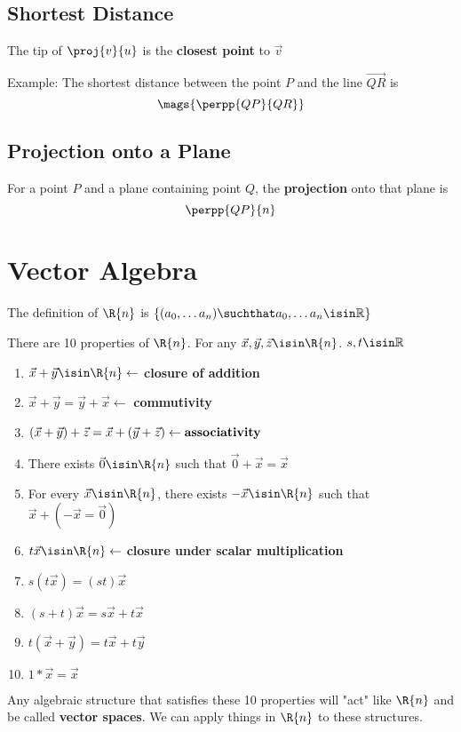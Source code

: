 \documentclass[12pt]{article}
\begin{document}
\subsection*{Shortest Distance}
The tip of $\proj{v}{u}$ is the {\bf closest point} to $\vec{v}$

Example: The shortest distance between the point $P$ and the line $\vec{QR}$ is \[ \mags{\perpp{QP}{QR}} \]

\subsection*{Projection onto a Plane}
For a point $P$ and a plane containing point $Q$, the {\bf projection} onto that plane is \[ \perpp{QP}{n} \]

\section*{Vector Algebra}
The definition of $\R{n}$ is $\{(a_0,\dots a_n)\suchthat a_0,\dots a_n\isin\mathbb{R}\}$

There are 10 properties of $\R{n}$. For any $\vec{x}, \vec{y}, \vec{z}\isin\R{n}$. $s,t\isin\mathbb{R}$
\begin{enumerate}
\item $\vec{x} + \vec{y}\isin\R{n} \leftarrow$ {\bf closure of addition}
\item $\vec{x} + \vec{y} = \vec{y} + \vec{x} \leftarrow$ {\bf commutivity}
\item $(\vec{x} + \vec{y}) + \vec{z} = \vec{x} + (\vec{y} + \vec{z}) \leftarrow {\bf associativity}$
\item There exists $\vec{0}\isin\R{n}$ such that $\vec{0} + \vec{x} = \vec{x}$
\item For every $\vec{x}\isin\R{n}$, there exists $-\vec{x}\isin\R{n}$ such that $\vec{x} + (-\vec{x} = \vec{0})$
\item $t\vec{x}\isin\R{n} \leftarrow$ {\bf closure under scalar multiplication}
\item $s(t\vec{x}) = (st)\vec{x}$
\item $(s+t)\vec{x} = s\vec{x} + t\vec{x}$
\item $t(\vec{x} + \vec{y}) = t\vec{x} + t\vec{y}$
\item $1*\vec{x} = \vec{x}$
\end{enumerate}
Any algebraic structure that satisfies these 10 properties will "act" like $\R{n}$ and be called {\bf vector spaces}. We can apply things in $\R{n}$ to these structures.
\end{document}
